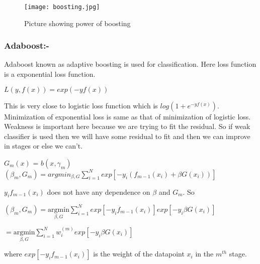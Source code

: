 \documentclass[twoside]{article}
\begin{document}
\begin{figure}
\centering
\texttt{[image: boosting.jpg]}
\caption{Picture showing power of boosting}
\end{figure}
\subsubsection*{Adaboost:-}
Adaboost known as adaptive boosting is used for classification. Here loss function is a exponential loss function.
\begin{center}
$ L(y, f(x)) = exp(-yf(x))$
\end{center}
This is very close to logistic loss function which is $log(1 + e^{-yf(x)})$. Minimization of exponential loss is same as that of minimization of logistic loss.\\
Weakness is important here because we are trying to fit the residual. So if weak classifier is used then we will have some residual to fit and then we can improve in stages or else we can't.\\
\begin{center}
$G_{m}(x)$ = $b(x, \gamma_{m})$ \\
$(\beta_{m}, G_{m}) = argmin_{\beta, G} \sum\limits_{i=1}^N exp[-y_{i}(f_{m-1}(x_{i}) + \beta G(x_i))]$
\end{center}

$ y_{i}f_{m-1}(x_{i})$ does not have any dependence on $\beta$ and $G_{m}$. So 
\begin{center}
$(\beta_{m}, G_{m}) = \underset{\beta, G}{\text{argmin}} \sum\limits_{i=1}^N exp[-y_{i}f_{m-1}(x_{i})]exp[-y_{i}\beta G(x_i)]$ 

$ = \underset{\beta, G}{\text{argmin}} \sum\limits_{i=1}^N w_{i}^{(m)}exp[-y_{i}\beta G(x_i)]$
\end{center}
where $exp[-y_{i}f_{m-1}(x_{i})]$ is the weight of the datapoint $x_{i}$ in the $m^{th}$ stage.
\end{document}
